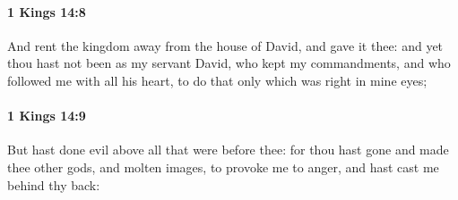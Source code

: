 		\paragraph{1 Kings 14:8} %
			\label{1KINGS-14-8}

			And rent the kingdom away from the house of David, and gave it thee: and yet thou hast not been as my servant David, who kept my commandments, and who followed me with all his heart, to do that only which was right in mine eyes;


		\paragraph{1 Kings 14:9} %
			\label{1KINGS-14-9}

			But hast done evil above all that were before thee: for thou hast gone and made thee other gods, and molten images, to provoke me to anger, and hast cast me behind thy back:

